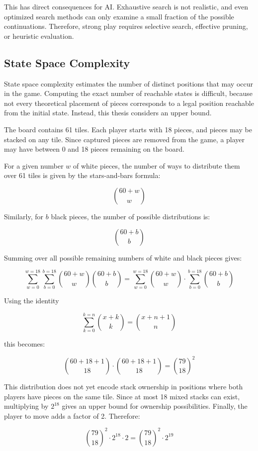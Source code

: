 This has direct consequences for AI. Exhaustive search is not realistic, and even optimized search methods can only examine a small fraction of the possible continuations. Therefore, strong play requires selective search, effective pruning, or heuristic evaluation.

\subsection{State Space Complexity}

State space complexity estimates the number of distinct positions that may occur in the game. Computing the exact number of reachable states is difficult, because not every theoretical placement of pieces corresponds to a legal position reachable from the initial state. Instead, this thesis considers an upper bound.

The board contains 61 tiles. Each player starts with 18 pieces, and pieces may be stacked on any tile. Since captured pieces are removed from the game, a player may have between 0 and 18 pieces remaining on the board.

For a given number $w$ of white pieces, the number of ways to distribute them over 61 tiles is given by the stars-and-bars formula:

 \[ \binom{60+w}{w} \]

Similarly, for $b$ black pieces, the number of possible distributions is:

 \[ \binom{60+b}{b} \]

Summing over all possible remaining numbers of white and black pieces gives:

 \[ \sum_{w=0}^{w=18}\sum_{b=0}^{b=18}\binom{60+w}{w}\binom{60+b}{b} = \sum_{w=0}^{w=18}\binom{60+w}{w} \cdot \sum_{b=0}^{b=18}\binom{60+b}{b} \]

Using the identity

 \[ \sum_{k=0}^{k=n}\binom{x+k}{k} = \binom{x+n+1}{n} \]

this becomes:

 \[ \binom{60+18+1}{18} \cdot \binom{60+18+1}{18} = \binom{79}{18}^2 \]

This distribution does not yet encode stack ownership in positions where both players have pieces on the same tile. Since at most 18 mixed stacks can exist, multiplying by $2^{18}$ gives an upper bound for ownership possibilities. Finally, the player to move adds a factor of 2. Therefore:

 \[ \binom{79}{18}^2 \cdot 2^{18} \cdot 2 = \binom{79}{18}^2 \cdot 2^{19} \]

